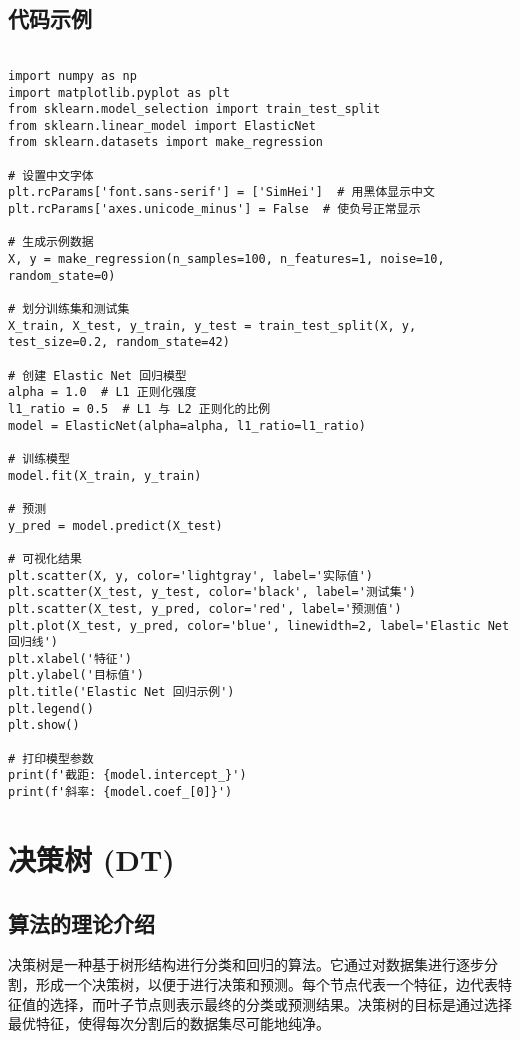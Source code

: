 \subsection*{代码示例}

\begin{lstlisting}

import numpy as np
import matplotlib.pyplot as plt
from sklearn.model_selection import train_test_split
from sklearn.linear_model import ElasticNet
from sklearn.datasets import make_regression

# 设置中文字体
plt.rcParams['font.sans-serif'] = ['SimHei']  # 用黑体显示中文
plt.rcParams['axes.unicode_minus'] = False  # 使负号正常显示

# 生成示例数据
X, y = make_regression(n_samples=100, n_features=1, noise=10, random_state=0)

# 划分训练集和测试集
X_train, X_test, y_train, y_test = train_test_split(X, y, test_size=0.2, random_state=42)

# 创建 Elastic Net 回归模型
alpha = 1.0  # L1 正则化强度
l1_ratio = 0.5  # L1 与 L2 正则化的比例
model = ElasticNet(alpha=alpha, l1_ratio=l1_ratio)

# 训练模型
model.fit(X_train, y_train)

# 预测
y_pred = model.predict(X_test)

# 可视化结果
plt.scatter(X, y, color='lightgray', label='实际值')
plt.scatter(X_test, y_test, color='black', label='测试集')
plt.scatter(X_test, y_pred, color='red', label='预测值')
plt.plot(X_test, y_pred, color='blue', linewidth=2, label='Elastic Net 回归线')
plt.xlabel('特征')
plt.ylabel('目标值')
plt.title('Elastic Net 回归示例')
plt.legend()
plt.show()

# 打印模型参数
print(f'截距: {model.intercept_}')
print(f'斜率: {model.coef_[0]}')

\end{lstlisting}

\section{决策树 (DT)}
\subsection*{算法的理论介绍}
决策树是一种基于树形结构进行分类和回归的算法。它通过对数据集进行逐步分割，形成一个决策树，以便于进行决策和预测。每个节点代表一个特征，边代表特征值的选择，而叶子节点则表示最终的分类或预测结果。决策树的目标是通过选择最优特征，使得每次分割后的数据集尽可能地纯净。

